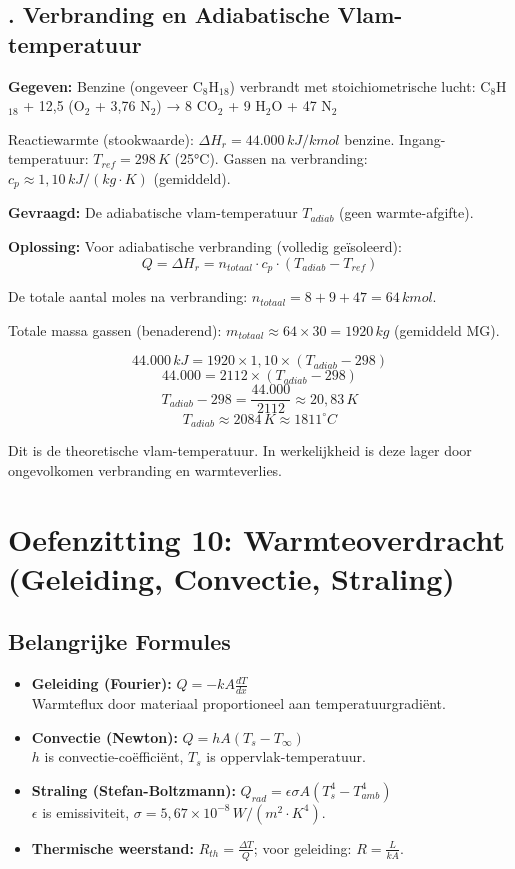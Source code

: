 \documentclass[a4paper,11pt,twoside]{report}
\newcounter{opgave}[section]
\newcommand{\opgave}[1]{%
    \refstepcounter{opgave}%
    \subsection*{\textbf{\arabic{opgave}.} #1}%
}
\begin{document}
\opgave{Verbranding en Adiabatische Vlam-temperatuur}
\textbf{Gegeven:}
Benzine (ongeveer C$_8$H$_{18}$) verbrandt met stoichiometrische lucht:
C$_8$H$_{18}$ + 12,5 (O$_2$ + 3,76 N$_2$) → 8 CO$_2$ + 9 H$_2$O + 47 N$_2$

Reactiewarmte (stookwaarde): $\Delta H_r = 44.000 \, kJ/kmol$ benzine.
Ingang-temperatuur: $T_{ref} = 298 \, K$ (25°C).
Gassen na verbranding: $c_p \approx 1,10 \, kJ/(kg \cdot K)$ (gemiddeld).

\textbf{Gevraagd:}
De adiabatische vlam-temperatuur $T_{adiab}$ (geen warmte-afgifte).

\textbf{Oplossing:}
Voor adiabatische verbranding (volledig geïsoleerd):
\[ Q = \Delta H_r = n_{totaal} \cdot c_p \cdot (T_{adiab} - T_{ref}) \]

De totale aantal moles na verbranding:
$n_{totaal} = 8 + 9 + 47 = 64 \, kmol$.

Totale massa gassen (benaderend):
$m_{totaal} \approx 64 \times 30 = 1920 \, kg$ (gemiddeld MG).

\[ 44.000 \, kJ = 1920 \times 1,10 \times (T_{adiab} - 298) \]
\[ 44.000 = 2112 \times (T_{adiab} - 298) \]
\[ T_{adiab} - 298 = \frac{44.000}{2112} \approx 20,83 \, K \]
\[ T_{adiab} \approx 2084 \, K \approx 1811^\circ C \]

Dit is de theoretische vlam-temperatuur. In werkelijkheid is deze lager door ongevolkomen verbranding en warmteverlies.

\section*{Oefenzitting 10: Warmteoverdracht (Geleiding, Convectie, Straling)}
\setcounter{opgave}{0}
\subsection*{Belangrijke Formules}
\begin{itemize}
    \item \textbf{Geleiding (Fourier):} $Q = -k A \frac{dT}{dx}$ \\
    Warmteflux door materiaal proportioneel aan temperatuurgradiënt.
    \item \textbf{Convectie (Newton):} $Q = h A (T_s - T_\infty)$ \\
    $h$ is convectie-coëfficiënt, $T_s$ is oppervlak-temperatuur.
    \item \textbf{Straling (Stefan-Boltzmann):} $Q_{rad} = \epsilon \sigma A (T_s^4 - T_{amb}^4)$ \\
    $\epsilon$ is emissiviteit, $\sigma = 5,67 \times 10^{-8} \, W/(m^2 \cdot K^4)$.
    \item \textbf{Thermische weerstand:} $R_{th} = \frac{\Delta T}{Q}$; voor geleiding: $R = \frac{L}{kA}$.
\end{itemize}
\end{document}
